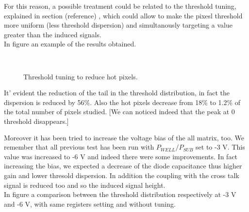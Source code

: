  
For this reason, a possible treatment could be related to the threshold tuning, explained in section (reference) , which could allow to make the pixesl threshold more uniform (less threshold dispersion) and simultanously targeting a value greater than the induced signals. \\

In figure  an example of the results obtained.

\begin{figure}
\centering
{}\quad
{}\\
\caption{Threshold tuning to reduce hot pixels.}
\label{fig:tuning_hot}
\end{figure} 

It' evident the reduction of the tail in the threshold distribution, in fact the dispersion is reduced by 56\%. Also the hot pixels decrease from 18\% to 1.2\% of the total number of pixels studied. [We can noticed indeed that the peak at 0 threshold disappears.]


Moreover it has been tried to increase the voltage bias of the all matrix, too. We remember that all previous test has been run with $P_{WELL}/P_{SUB}$ set to -3 V. This value was increased to -6 V and indeed there were some improvements. In fact increasing the bias, we expected a decrease of the diode capacitance thus higher gain and lower thresold dispersion. In addition the coupling with the cross talk signal is reduced too and so the induced signal height. \\
In figure  a comparison between the threshold distribution respectively at -3 V and -6 V, with same registers setting and without tuning.

\begin{figure}[h!]
\centering
{}\quad
{}\\
\label{fig:bias_comp}
\end{figure}

